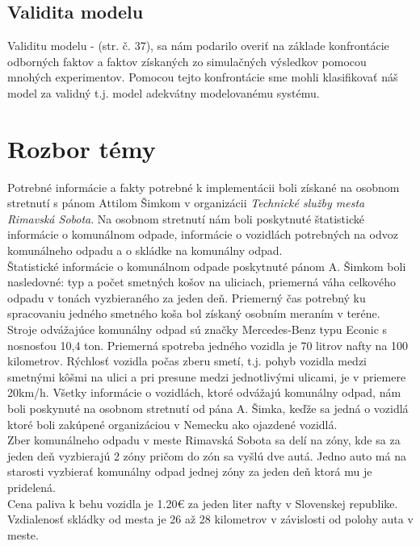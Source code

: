 \documentclass[11pt,a4paper]{article}
\begin{document}
    \subsection{Validita modelu}

        \indent Validitu modelu - \cite{IMS}(str. č. 37), sa nám podarilo overiť na základe konfrontácie odborných faktov a faktov získaných zo simulačných výsledkov pomocou mnohých experimentov. Pomocou tejto konfrontácie sme mohli klasifikovať náš model za validný t.j. model adekvátny modelovanému systému.

\section{Rozbor témy}

    \indent Potrebné informácie a fakty potrebné k implementácii boli získané na osobnom stretnutí s pánom Attilom Šimkom v organizácii \textit{Technické služby mesta Rimavská Sobota}\cite{TSMRS}. Na osobnom stretnutí nám boli poskytnuté štatistické informácie o komunálnom odpade, informácie o vozidlách potrebných na odvoz komunálneho odpadu a o skládke na komunálny odpad.\\[0.4em]
    \indent Štatistické informácie o komunálnom odpade poskytnuté pánom A. Šimkom boli nasledovné: typ a počet smetných košov na uliciach, priemerná váha celkového odpadu v tonách vyzbieraného za jeden deň. Priemerný čas potrebný ku spracovaniu jedného smetného koša bol získaný osobním meraním v teréne.\\[0.4em]
    \indent Stroje odvážajúce komunálny odpad sú značky Mercedes-Benz typu Econic s nosnosťou 10,4 ton. Priemerná spotreba jedného vozidla je 70 litrov nafty na 100 kilometrov. Rýchlosť vozidla počas zberu smetí, t.j. pohyb vozidla medzi smetnými kôšmi na ulici a pri presune medzi jednotlivými ulicami, je v priemere 20km/h. Všetky informácie o vozidlách, ktoré odvážajú komunálny odpad, nám boli poskynuté na osobnom stretnutí od pána A. Šimka, keďže sa jedná o vozidlá ktoré boli zakúpené organizáciou v Nemecku ako ojazdené vozidlá.\\[0.4em]
    \indent Zber komunálneho odpadu v meste Rimavská Sobota sa delí na zóny\cite{ZONA}, kde sa za jeden deň vyzbierajú 2 zóny pričom do zón sa vyšlú dve autá. Jedno auto má na starosti vyzbierať komunálny odpad jednej zóny za jeden deň ktorá mu je pridelená.\\[0.4em]
    \indent Cena paliva k behu vozidla je 1.20\euro{} za jeden liter nafty\cite{NAFTA} v Slovenskej republike. Vzdialenosť skládky od mesta je 26 až 28 kilometrov v závislosti od polohy auta v meste\cite{VZDIALENOST}.
\end{document}
